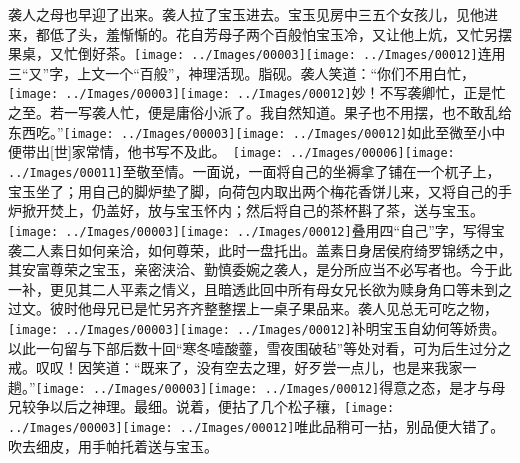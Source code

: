 袭人之母也早迎了出来。袭人拉了宝玉进去。宝玉见房中三五个女孩儿，见他进来，都低了头，羞惭惭的。花自芳母子两个百般怕宝玉冷，又让他上炕，又忙另摆果桌，又忙倒好茶。{\texttt{[image: ../Images/00003]}\texttt{[image: ../Images/00012]}\footnotesize \kaishu 连用三``又''字，上文一个``百般''，神理活现。脂砚。}袭人笑道：``你们不用白忙，{\texttt{[image: ../Images/00003]}\texttt{[image: ../Images/00012]}\footnotesize \kaishu 妙！不写袭卿忙，正是忙之至。若一写袭人忙，便是庸俗小派了。}我自然知道。果子也不用摆，也不敢乱给东西吃。''{\texttt{[image: ../Images/00003]}\texttt{[image: ../Images/00012]}\footnotesize \kaishu 如此至微至小中便带出{[}世{]}家常情，他书写不及此。　\texttt{[image: ../Images/00006]}\texttt{[image: ../Images/00011]}\footnotesize \kaishu 至敬至情。}一面说，一面将自己的坐褥拿了铺在一个杌子上，宝玉坐了；用自己的脚炉垫了脚，向荷包内取出两个梅花香饼儿来，又将自己的手炉掀开焚上，仍盖好，放与宝玉怀内；然后将自己的茶杯斟了茶，送与宝玉。{\texttt{[image: ../Images/00003]}\texttt{[image: ../Images/00012]}\footnotesize \kaishu 叠用四``自己''字，写得宝袭二人素日如何亲洽，如何尊荣，此时一盘托出。盖素日身居侯府绮罗锦绣之中，其安富尊荣之宝玉，亲密浃洽、勤慎委婉之袭人，是分所应当不必写者也。今于此一补，更见其二人平素之情义，且暗透此回中所有母女兄长欲为赎身角口等未到之过文。}彼时他母兄已是忙另齐齐整整摆上一桌子果品来。袭人见总无可吃之物，{{\texttt{[image: ../Images/00003]}\texttt{[image: ../Images/00012]}\footnotesize \kaishu 补明宝玉自幼何等娇贵。以此一句留与下部后数十回``寒冬噎酸}虀{，雪夜围破毡''等处对看，可为后生过分之戒。叹叹！}}因笑道：``既来了，没有空去之理，好歹尝一点儿，也是来我家一趟。''{\texttt{[image: ../Images/00003]}\texttt{[image: ../Images/00012]}\footnotesize \kaishu 得意之态，是才与母兄较争以后之神理。最细。}说着，便拈了几个松子穰，{\texttt{[image: ../Images/00003]}\texttt{[image: ../Images/00012]}\footnotesize \kaishu 唯此品稍可一拈，别品便大错了。}吹去细皮，用手帕托着送与宝玉。

